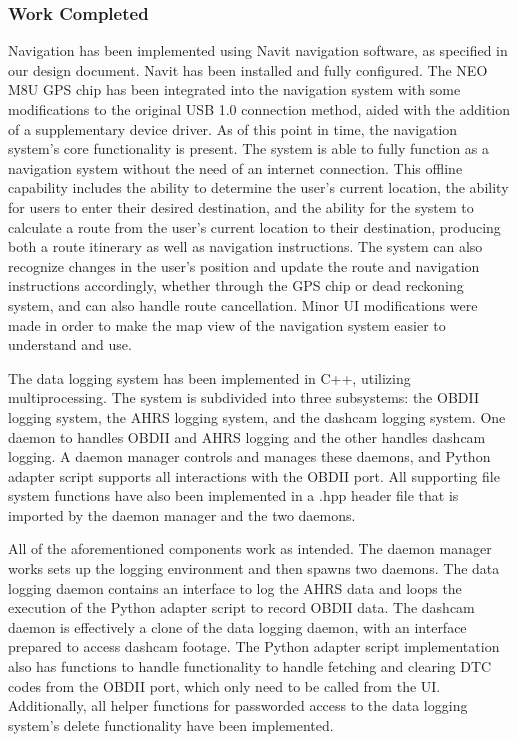 \documentclass[onecolumn, draftclsnofoot,10pt, compsoc]{IEEEtran}
\begin{document}
\subsubsection{Work Completed}
	Navigation has been implemented using Navit navigation software, as specified in our design document. Navit has been installed and fully configured. The NEO M8U GPS chip has been integrated into the navigation system with some modifications to the original USB 1.0 connection method, aided with the addition of a supplementary device driver. As of this point in time, the navigation system's core functionality is present. The system is able to fully function as a navigation system without the need of an internet connection. This offline capability includes the ability to determine the user's current location, the ability for users to enter their desired destination, and the ability for the system to calculate a route from the user's current location to their destination, producing both a route itinerary as well as navigation instructions. The system can also recognize changes in the user's position and update the route and navigation instructions accordingly, whether through the GPS chip or dead reckoning system, and can also handle route cancellation. Minor UI modifications were made in order to make the map view of the navigation system easier to understand and use.\par
	The data logging system has been implemented in C++, utilizing multiprocessing. The system is subdivided into three subsystems: the OBDII logging system, the AHRS logging system, and the dashcam logging system. One daemon to handles OBDII and AHRS logging and the other handles dashcam logging. A daemon manager controls and manages these daemons, and Python adapter script supports all interactions with the OBDII port. All supporting file system functions have also been implemented in a .hpp header file that is imported by the daemon manager and the two daemons.\par
All of the aforementioned components work as intended. The daemon manager works sets up the logging environment and then spawns two daemons. The data logging daemon contains an interface to log the AHRS data and loops the execution of the Python adapter script to record OBDII data. The dashcam daemon is effectively a clone of the data logging daemon, with an interface prepared to access dashcam footage. The Python adapter script implementation also has functions to handle functionality to handle fetching and clearing DTC codes from the OBDII port, which only need to be called from the UI. Additionally, all helper functions for passworded access to the data logging system's delete functionality have been implemented.\par
\end{document}
